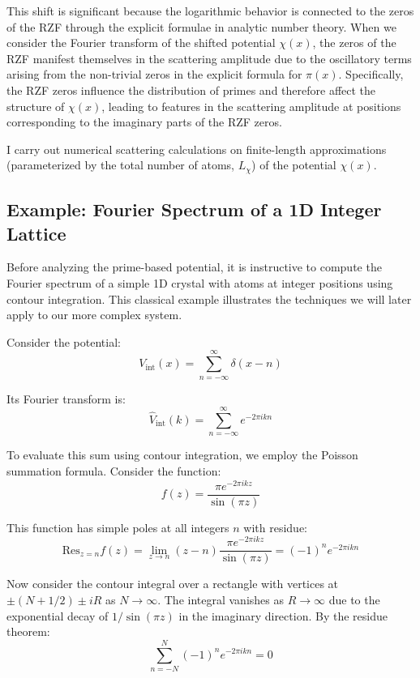 \documentclass[11pt, oneside]{article}
\begin{document}
This shift is significant because the logarithmic behavior is connected to the zeros of the RZF through the explicit formulae in analytic number theory. When we consider the Fourier transform of the shifted potential $\chi(x)$, the zeros of the RZF manifest themselves in the scattering amplitude due to the oscillatory terms arising from the non-trivial zeros in the explicit formula for $\pi(x)$. Specifically, the RZF zeros influence the distribution of primes and therefore affect the structure of $\chi(x)$, leading to features in the scattering amplitude at positions corresponding to the imaginary parts of the RZF zeros.

I carry out numerical scattering calculations on finite-length approximations (parameterized by the total number of atoms, $L_{\chi}$) of the potential $\chi(x)$.

\subsection{Example: Fourier Spectrum of a 1D Integer Lattice}

Before analyzing the prime-based potential, it is instructive to compute the Fourier spectrum of a simple 1D crystal with atoms at integer positions using contour integration. This classical example illustrates the techniques we will later apply to our more complex system.

Consider the potential:
\begin{equation}
V_{\text{int}}(x) = \sum_{n=-\infty}^{\infty} \delta(x - n)
\end{equation}

Its Fourier transform is:
\begin{equation}
\hat{V}_{\text{int}}(k) = \sum_{n=-\infty}^{\infty} e^{-2\pi i k n}
\end{equation}

To evaluate this sum using contour integration, we employ the Poisson summation formula. Consider the function:
\begin{equation}
f(z) = \frac{\pi e^{-2\pi i k z}}{\sin(\pi z)}
\end{equation}

This function has simple poles at all integers $n$ with residue:
\begin{equation}
\text{Res}_{z=n} f(z) = \lim_{z \to n} (z-n) \frac{\pi e^{-2\pi i k z}}{\sin(\pi z)} = (-1)^n e^{-2\pi i k n}
\end{equation}

Now consider the contour integral over a rectangle with vertices at $\pm(N+1/2) \pm iR$ as $N \to \infty$. The integral vanishes as $R \to \infty$ due to the exponential decay of $1/\sin(\pi z)$ in the imaginary direction. By the residue theorem:
\begin{equation}
\sum_{n=-N}^{N} (-1)^n e^{-2\pi i k n} = 0
\end{equation}
\end{document}
